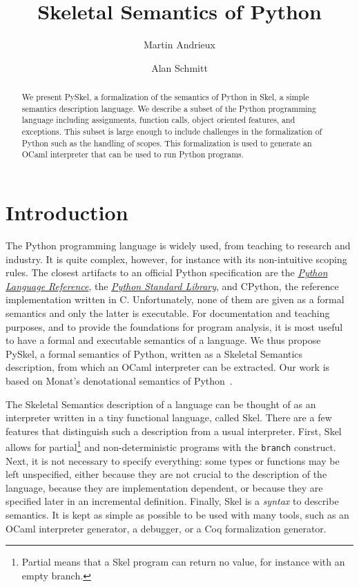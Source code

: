\documentclass[submission,copyright,creativecommons]{eptcs}
\title{Skeletal Semantics of Python}
\author{Martin Andrieux
  \institute{ENS Rennes, France}
  \email{martin.andrieux@ens-rennes.fr}
  \and
  Alan Schmitt
  \institute{INRIA, France}
  \email{alan.schmitt@inria.fr}
}
\newcommand{\skinl}[1]{\texttt{#1}}
\begin{document}
\maketitle


\begin{abstract}
  We present PySkel, a formalization of the semantics of Python in Skel, a simple
  semantics description language.
  We describe a subset of the Python programming language including assignments,
  function calls, object oriented features, and exceptions. This subset is large
  enough to include challenges in the formalization of Python such as the
  handling of scopes.
  This formalization is used to generate an OCaml interpreter
  that can be used to run Python programs.
\end{abstract}

\section{Introduction}\label{sec:introduction}

The Python programming language is widely used, from teaching to research and industry. It is quite complex, however, for
instance with its non-intuitive scoping rules. The closest artifacts to an
official Python specification are
the
\href{https://docs.python.org/3/reference/}{\emph{Python Language Reference}}, the
\href{https://docs.python.org/3/library/}{\emph{Python Standard Library}}, and CPython,
the reference implementation written in C. Unfortunately, none of them are given
as a formal semantics and only the latter is executable. For documentation and
teaching purposes, and to provide the foundations for program analysis, it is most
useful to have a formal and executable semantics of a language. We thus propose PySkel, a formal
semantics of Python, written as a Skeletal Semantics~\cite{noizet:hal-03784478}
description, from which an OCaml interpreter can be extracted. Our work is based
on Monat's denotational semantics of Python~\cite{Monat2021}.

The Skeletal Semantics description of a language can be thought of as an
interpreter written in a tiny functional language, called Skel. There are a few features
that distinguish such a description from a usual interpreter. First, Skel allows
for partial\footnote{Partial means that a Skel program can return no value, for
  instance with an empty branch.} and non-deterministic programs with the \skinl{branch} construct.
Next, it is not necessary to specify everything: some types or functions may be
left unspecified, either because they are not crucial to the description of the
language, because they are implementation dependent, or because they are
specified later in an incremental definition. Finally, Skel is a
\emph{syntax} to describe semantics. It is kept as simple as possible to be used
with many tools, such as an OCaml interpreter generator, a debugger, or a Coq
formalization generator.
\end{document}
